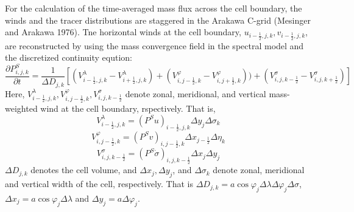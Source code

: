 \documentclass{article}
\begin{document}
For the calculation of the time-averaged mass flux across the cell boundary, the winds and the tracer distributions are staggered in the Arakawa C-grid (Mesinger and Arakawa 1976). Tne horizontal winds at the cell boundary, $u_{i-\frac{1}{2},j,k}, v_{i-\frac{1}{2},j,k}$, are reconstructed by using the mass convergence field in the spectral model and the discretized continuity eqution: 
\begin{equation}
  \frac{\partial P^{S}_{i,j,k} }{\partial t}=\frac{1}{\Delta D_{j,k}}[(V^{\lambda}_{i-\frac{1}{2},j,k}-V^{\lambda}_{i+\frac{1}{2},j,k})+(V^{\varphi}_{i,j-\frac{1}{2},k}-V^{\varphi}_{i,j+\frac{1}{2},k}))+(V^{\sigma}_{i,j,k-\frac{1}{2}}-V^{\sigma}_{i,j,k+\frac{1}{2}})]
\end{equation}
Here, $V^{\lambda}_{i-\frac{1}{2},j,k}, V^{\varphi}_{i,j-\frac{1}{2},k}, V^{\sigma}_{i,j,k-\frac{1}{2}}$ denote zonal, meridional, and vertical mass-weighted wind at the cell boundary, rspectively. That is, 
\begin{equation}
  V^{\lambda}_{i-\frac{1}{2},j,k}=(P^{S}u)_{i-\frac{1}{2},j,k} \Delta y_{j} \Delta \sigma_{k}
\end{equation}
\begin{equation}
  V^{\varphi}_{i,j-\frac{1}{2},k}=(P^{S}v)_{i,j-\frac{1}{2},k} \Delta x_{j-\frac{1}{2}} \Delta \eta_{k}
\end{equation}
\begin{equation}
  V^{\sigma}_{i,j,k-\frac{1}{2}}=(P^{S}\dot{\sigma})_{i,j,k-\frac{1}{2}} \Delta x_{j} \Delta y_{j}
\end{equation}
$\Delta D_{j,k}$ denotes the cell volume, and $\Delta x_{j}, \Delta y_{j}$, and $\Delta \sigma_{k}$ denote zonal, meridional and vertical width of the cell, respectively. That is $\Delta D_{j,k}=a \cos \varphi_{j}\Delta \lambda \Delta \varphi_{j} \Delta \sigma$, $\Delta x_{j}=a \cos \varphi_{j} \Delta \lambda$ and $\Delta y_{j}=a \Delta \varphi_{j}$.
\end{document}
